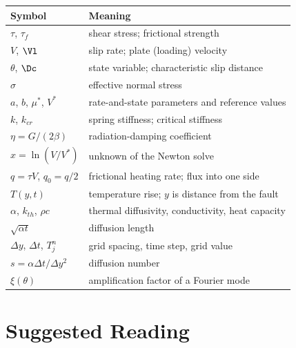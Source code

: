 \begin{center}
\small
\begin{tabular}{ll}
\toprule
Symbol & Meaning \\
\midrule
$\tau$, $\tau_f$ & shear stress; frictional strength \\
$V$, $\Vl$ & slip rate; plate (loading) velocity \\
$\theta$, $\Dc$ & state variable; characteristic slip distance \\
$\sigma$ & effective normal stress \\
$a$, $b$, $\mu^*$, $V^*$ & rate-and-state parameters and reference values \\
$k$, $k_{cr}$ & spring stiffness; critical stiffness \\
$\eta=G/(2\beta)$ & radiation-damping coefficient \\
$x=\ln(V/V^*)$ & unknown of the Newton solve \\
$q=\tau V$, $q_0=q/2$ & frictional heating rate; flux into one side \\
$T(y,t)$ & temperature rise; $y$ is distance from the fault \\
$\alpha$, $k_{th}$, $\rho c$ & thermal diffusivity, conductivity, heat capacity \\
$\sqrt{\alpha t}$ & diffusion length \\
$\Delta y$, $\Delta t$, $T_j^n$ & grid spacing, time step, grid value \\
$s=\alpha\Delta t/\Delta y^2$ & diffusion number \\
$\xi(\theta)$ & amplification factor of a Fourier mode \\
\bottomrule
\end{tabular}
\end{center}

\section{Suggested Reading}
\label{sec:l3-reading}

